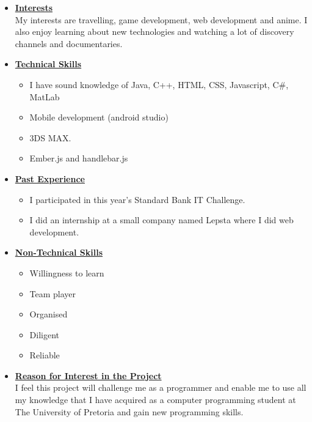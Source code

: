 \documentclass[a4paper,12pt]{article}
\begin{document}
\begin{itemize}
\item {\Large \underline{\textbf{Interests}}}\\[0.2cm]
My interests are travelling, game development, web development and anime. I also enjoy learning about new technologies and watching a lot of discovery channels and documentaries.

\item {\Large \underline{\textbf{Technical Skills}}}
	\begin{itemize}
		\item I have sound knowledge of Java, C++, HTML, CSS, Javascript, C\#, MatLab
		\item Mobile development (android studio) 
		\item 3DS MAX.
		\item Ember.js and  handlebar.js
	\end{itemize}
\bigskip
\item {\Large \underline{\textbf{Past Experience}}}
\begin{itemize}
\item I participated in this year's Standard Bank IT Challenge.
\item I did an internship at a small company named Lepsta where I did web development.
\end{itemize}
\bigskip
\item {\Large \underline{\textbf{Non-Technical Skills}}}
\begin{itemize}
\item Willingness to learn
\item Team player
\item Organised
\item Diligent
\item Reliable
\end{itemize}
\bigskip
\item {\Large \underline{\textbf{Reason for Interest in the Project}}}\\[0.2cm]
I feel this project will challenge me as a programmer and enable me to use all my knowledge that I have acquired as a computer programming student at The University of Pretoria and gain new programming skills.

\end{itemize}

\newpage
\end{document}
